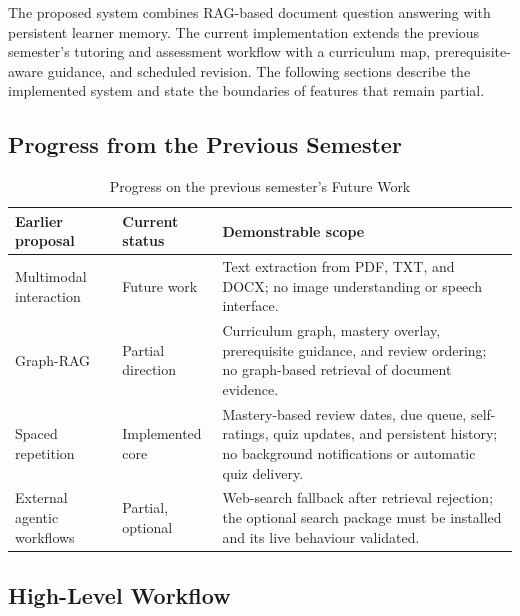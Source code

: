 \documentclass[11pt, a4paper, oneside]{report}
\begin{document}
The proposed system combines RAG-based document question answering with persistent learner memory. The current implementation extends the previous semester's tutoring and assessment workflow with a curriculum map, prerequisite-aware guidance, and scheduled revision. The following sections describe the implemented system and state the boundaries of features that remain partial.

\subsection{Progress from the Previous Semester}
\begin{table}[H]
\centering\small
\caption{Progress on the previous semester's Future Work}
\label{tab:semester_progress}
\begin{tabular}{@{}p{3.0cm} p{2.4cm} p{7cm}@{}}
\toprule
\textbf{Earlier proposal} & \textbf{Current status} & \textbf{Demonstrable scope} \\
\midrule
Multimodal interaction & Future work & Text extraction from PDF, TXT, and DOCX; no image understanding or speech interface. \\[5pt]
Graph-RAG & Partial direction & Curriculum graph, mastery overlay, prerequisite guidance, and review ordering; no graph-based retrieval of document evidence. \\[5pt]
Spaced repetition & Implemented core & Mastery-based review dates, due queue, self-ratings, quiz updates, and persistent history; no background notifications or automatic quiz delivery. \\[5pt]
External agentic workflows & Partial, optional & Web-search fallback after retrieval rejection; the optional search package must be installed and its live behaviour validated. \\
\bottomrule
\end{tabular}
\end{table}

\subsection{High-Level Workflow}
\end{document}
